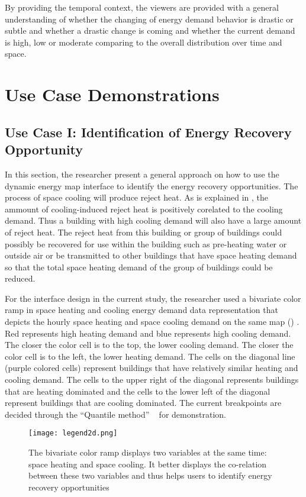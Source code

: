 By providing the temporal context, the viewers are provided with a
general understanding of whether the changing of energy demand
behavior is drastic or subtle and whether a drastic change is coming
and whether the current demand is high, low or moderate comparing to
the overall distribution over time and space.

\pagebreak
\section{Use Case Demonstrations}
\subsection{Use Case I: Identification of Energy Recovery Opportunity}\label{useCase1}
In this section, the researcher present a general approach on how to
use the dynamic energy map interface to identify the energy recovery
opportunities. The process of space cooling will produce reject
heat. As is explained in , the ammount of
cooling-induced reject heat is positively corelated to the cooling
demand. Thus a building with high cooling demand will also have a
large amount of reject heat. The reject heat from this building or
group of buildings could possibly be recovered for use within the
building such as pre-heating water or outside air or be transmitted to
other buildings that have space heating demand so that the total space
heating demand of the group of buildings could be reduced.

For the interface design in the current study, the researcher used a
bivariate color ramp in space heating and cooling energy demand data
representation that depicts the hourly space heating and space cooling
demand on the same map () . Red represents high
heating demand and blue represents high cooling demand. The closer the
color cell is to the top, the lower cooling demand. The closer the
color cell is to the left, the lower heating demand. The cells on the
diagonal line (purple colored cells) represent buildings that have
relatively similar heating and cooling demand. The cells to the upper
right of the diagonal represents buildings that are heating dominated
and the cells to the lower left of the diagonal represent buildings
that are cooling dominated. The current breakpoints are decided
through the ``Quantile method'' ~\cite{GIS_Jenks2014} for
demonstration.

\begin{figure}[h!]
  \centering
  \texttt{[image: legend2d.png]}
  \caption[Heating-Cooling Map Legend Illustration]{The bivariate
    color ramp displays two variables at the same time: space heating
    and space cooling. It better displays the co-relation between
    these two variables and thus helps users to identify energy
    recovery opportunities}
  \label{fig:legend2d}
\end{figure}

